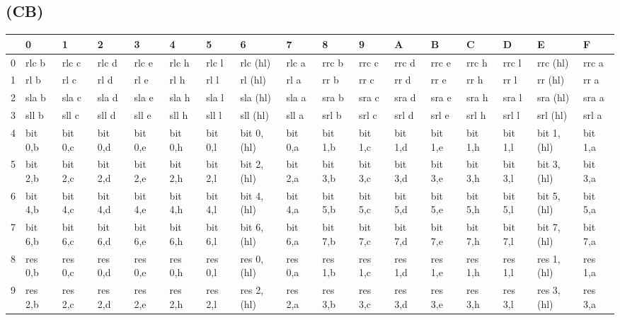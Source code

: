 \subsection{ (CB)}
\label{OPCCB}
\begin{ttfamily}
\begin{tiny}
\begin{tabularx}{1\textwidth}{l|X|X|X|X|X|X|X|X|X|X|X|X|X|X|X|X}
  & 0 & 1   & 2       & 3       & 4 & 5 & 6 & 7 & 8 & 9 & A & B & C & D & E & F \\ \hline
0 & rlc b   & rlc c   & rlc d   & rlc e & rlc h & rlc l & rlc (hl) & rlc a & rrc b & rrc c & rrc d & rrc e & rrc h & rrc l & rrc (hl) & rrc a \\ \hline
1 & rl b    & rl c    & rl d    & rl e & rl h & rl l & rl (hl) & rl a & rr b & rr c & rr d & rr e & rr h & rr l & rr (hl) & rr a \\ \hline
2 & sla b   & sla c   & sla d   & sla e & sla h & sla l & sla (hl) & sla a & sra b & sra c & sra d & sra e & sra h & sra l & sra (hl) & sra a \\ \hline
3 & sll b   & sll c   & sll d   & sll e & sll h & sll l & sll (hl) & sll a & srl b & srl c & srl d & srl e & srl h & srl l & srl (hl) & srl a \\ \hline
4 & bit 0,b & bit 0,c & bit 0,d & bit 0,e & bit 0,h & bit 0,l & bit 0,(hl) & bit 0,a & bit 1,b & bit 1,c & bit 1,d & bit 1,e & bit 1,h & bit 1,l & bit 1,(hl) & bit 1,a \\ \hline
5 & bit 2,b & bit 2,c & bit 2,d & bit 2,e & bit 2,h & bit 2,l & bit 2,(hl) & bit 2,a & bit 3,b & bit 3,c & bit 3,d & bit 3,e & bit 3,h & bit 3,l & bit 3,(hl) & bit 3,a \\ \hline
6 & bit 4,b & bit 4,c & bit 4,d & bit 4,e & bit 4,h & bit 4,l & bit 4,(hl) & bit 4,a & bit 5,b & bit 5,c & bit 5,d & bit 5,e & bit 5,h & bit 5,l & bit 5,(hl) & bit 5,a \\ \hline
7 & bit 6,b & bit 6,c & bit 6,d & bit 6,e & bit 6,h & bit 6,l & bit 6,(hl) & bit 6,a & bit 7,b & bit 7,c & bit 7,d & bit 7,e & bit 7,h & bit 7,l & bit 7,(hl) & bit 7,a \\ \hline
8 & res 0,b & res 0,c & res 0,d & res 0,e & res 0,h & res 0,l & res 0,(hl) & res 0,a & res 1,b & res 1,c & res 1,d & res 1,e & res 1,h & res 1,l & res 1,(hl) & res 1,a \\ \hline
9 & res 2,b & res 2,c & res 2,d & res 2,e & res 2,h & res 2,l & res 2,(hl) & res 2,a & res 3,b & res 3,c & res 3,d & res 3,e & res 3,h & res 3,l & res 3,(hl) & res 3,a \\ \hline

\end{tabularx}
\end{tiny}
\end{ttfamily}
